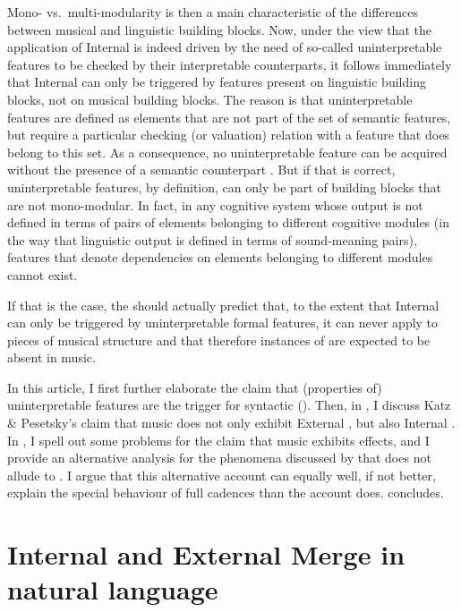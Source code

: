 \documentclass[output=paper]{langsci/langscibook}
\begin{document}
Mono- vs.\ multi-modularity is then a main characteristic of the differences
between musical and linguistic building blocks. Now, under the view that the
application of Internal  is indeed driven by the need of so-called
uninterpretable features to be checked by their interpretable counterparts, it
follows immediately that Internal  can only be triggered by features
present on linguistic building blocks, not on musical building blocks. The
reason is that uninterpretable features are defined as elements that are not
part of the set of semantic features, but require a particular checking (or
valuation) relation with a feature that does belong to this set. As a
consequence, no uninterpretable feature can be acquired without the presence of
a semantic counterpart
\parencite[see][]{Brody1997,Svenonius2007,Zeijlstra2008,Zeijlstra2012}. But if
that is correct, uninterpretable features, by definition, can only be part of
building blocks that are not mono-modular. In fact, in any cognitive system
whose output is not defined in terms of pairs of elements belonging to
different cognitive modules (in the way that linguistic output is defined in
terms of sound-meaning pairs), features that denote dependencies on elements
belonging to different modules cannot exist.

If that is the case, the  should
actually predict that, to the extent that Internal  can only be
triggered by uninterpretable formal features, it can never apply to pieces of
musical structure and that therefore instances of  are expected to be
absent in music.

In this article, I first further elaborate the claim that (properties of)
uninterpretable features are the trigger for syntactic 
(). Then, in , I discuss Katz \&
Pesetsky’s claim that music does not only exhibit External , but
also Internal . In , I spell out some problems
for the claim that music exhibits  effects, and I provide an
alternative analysis for the phenomena discussed by \citeauthor{KatzPes2011}
that does not allude to . I argue that this alternative account can
equally well, if not better, explain the special behaviour of full cadences
than the  account does.   concludes.

\section{Internal and External Merge in natural language}\label{sec:key:26.2}
\end{document}
